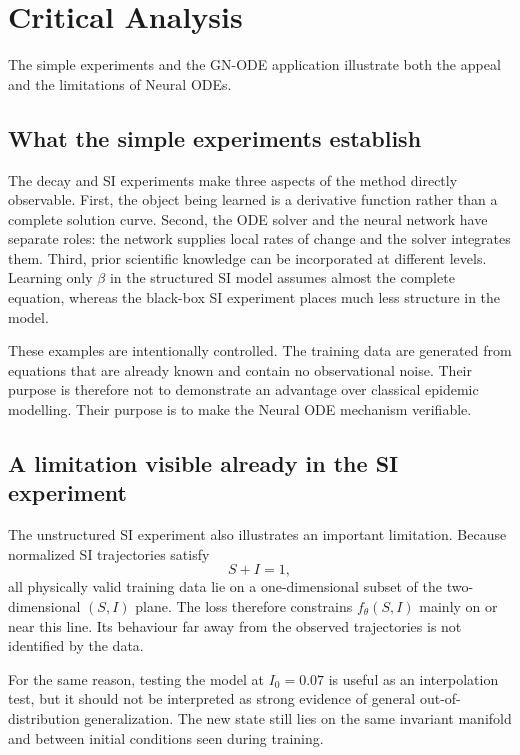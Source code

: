 \documentclass[11pt,a4paper]{article}
\begin{document}
\section{Critical Analysis}
\label{sec:critical}

The simple experiments and the GN-ODE application illustrate both the appeal
and the limitations of Neural ODEs.

\subsection{What the simple experiments establish}

The decay and SI experiments make three aspects of the method directly
observable. First, the object being learned is a derivative function rather
than a complete solution curve. Second, the ODE solver and the neural network
have separate roles: the network supplies local rates of change and the solver
integrates them. Third, prior scientific knowledge can be incorporated at
different levels. Learning only $\beta$ in the structured SI model assumes
almost the complete equation, whereas the black-box SI experiment places much
less structure in the model.

These examples are intentionally controlled. The training data are generated
from equations that are already known and contain no observational noise.
Their purpose is therefore not to demonstrate an advantage over classical
epidemic modelling. Their purpose is to make the Neural ODE mechanism
verifiable.


\subsection{A limitation visible already in the SI experiment}

The unstructured SI experiment also illustrates an important limitation.
Because normalized SI trajectories satisfy
\[
    S+I=1,
\]
all physically valid training data lie on a one-dimensional subset of the
two-dimensional $(S,I)$ plane. The loss therefore constrains
$f_\theta(S,I)$ mainly on or near this line. Its behaviour far away from the
observed trajectories is not identified by the data.

For the same reason, testing the model at $I_0=0.07$ is useful as an
interpolation test, but it should not be interpreted as strong evidence of
general out-of-distribution generalization. The new state still lies on the
same invariant manifold and between initial conditions seen during training.
\end{document}
